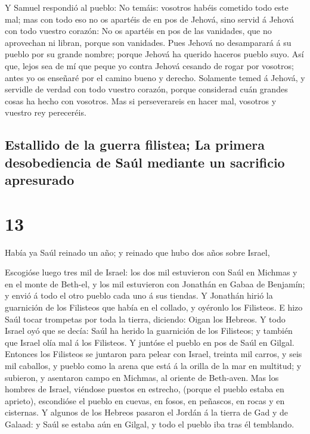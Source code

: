  Y Samuel respondió al pueblo: No temáis: vosotros habéis
cometido todo este mal; mas con todo eso no os apartéis de en pos de
Jehová, sino servid á Jehová con todo vuestro corazón: 
No os apartéis en pos de las vanidades, que no aprovechan ni libran,
porque son vanidades.  Pues Jehová no desamparará á su
pueblo por su grande nombre; porque Jehová ha querido haceros pueblo
suyo.  Así que, lejos sea de mí que peque yo contra
Jehová cesando de rogar por vosotros; antes yo os enseñaré por el camino
bueno y derecho.  Solamente temed á Jehová, y servidle de
verdad con todo vuestro corazón, porque considerad cuán grandes cosas ha
hecho con vosotros.  Mas si perseverareis en hacer mal,
vosotros y vuestro rey pereceréis.

\hypertarget{estallido-de-la-guerra-filistea-la-primera-desobediencia-de-sauxfal-mediante-un-sacrificio-apresurado}{%
\subsection{Estallido de la guerra filistea; La primera desobediencia de
Saúl mediante un sacrificio
apresurado}\label{estallido-de-la-guerra-filistea-la-primera-desobediencia-de-sauxfal-mediante-un-sacrificio-apresurado}}

\hypertarget{section-12}{%
\section{13}\label{section-12}}

 Había ya Saúl reinado un año; y reinado que hubo dos años
sobre Israel,

 Escogióse luego tres mil de Israel: los dos mil
estuvieron con Saúl en Michmas y en el monte de Beth-el, y los mil
estuvieron con Jonathán en Gabaa de Benjamín; y envió á todo el otro
pueblo cada uno á sus tiendas.  Y Jonathán hirió la
guarnición de los Filisteos que había en el collado, y oyéronlo los
Filisteos. E hizo Saúl tocar trompetas por toda la tierra, diciendo:
Oigan los Hebreos.  Y todo Israel oyó que se decía: Saúl
ha herido la guarnición de los Filisteos; y también que Israel olía mal
á los Filisteos. Y juntóse el pueblo en pos de Saúl en Gilgal.
 Entonces los Filisteos se juntaron para pelear con
Israel, treinta mil carros, y seis mil caballos, y pueblo como la arena
que está á la orilla de la mar en multitud; y subieron, y asentaron
campo en Michmas, al oriente de Beth-aven.  Mas los
hombres de Israel, viéndose puestos en estrecho, (porque el pueblo
estaba en aprieto), escondióse el pueblo en cuevas, en fosos, en
peñascos, en rocas y en cisternas.  Y algunos de los
Hebreos pasaron el Jordán á la tierra de Gad y de Galaad: y Saúl se
estaba aún en Gilgal, y todo el pueblo iba tras él temblando.

